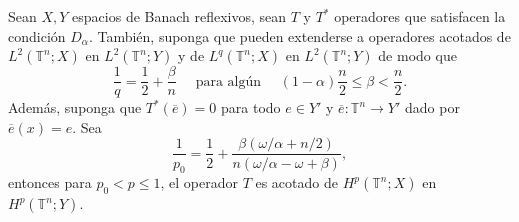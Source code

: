 \begin{theorem}
	Sean $X, Y$ espacios de Banach reflexivos, sean $T$ y  $T^*$ operadores que satisfacen la condición $D_\alpha$. También, suponga que pueden extenderse a operadores acotados de $L^2(\mathbb{T}^n;X)$ en $L^2(\mathbb{T}^n;Y)$ y de $L^q(\mathbb{T}^n;X)$ en $L^2(\mathbb{T}^n;Y)$ de modo que 
	\begin{equation}
		\frac{1}{q} = \frac{1}{2} + \frac{\beta}{n} \quad \text{ para algún } \quad (1-\alpha)\frac{n}{2}\leq \beta<\frac{n}{2}.
	\end{equation}
	Además, suponga que $T^*(\overline{e})=0$ para todo ${e}\in Y'$ y $\overline{e}:\mathbb{T}^n\rightarrow Y'$ dado por $\overline{e}(x)=e$. Sea 
	\begin{equation}
		\frac{1}{p_0}=\frac{1}{2} + \frac{\beta(\omega/\alpha+n/2)}{n(\omega/\alpha - \omega +\beta)},
	\end{equation}
	entonces para $p_0<p\leq1$, el operador $T$ es acotado de $H^p(\mathbb{T}^n;X)$ en $H^p(\mathbb{T}^n;Y)$.
	\label{theo:Hp-operator}
\end{theorem}

